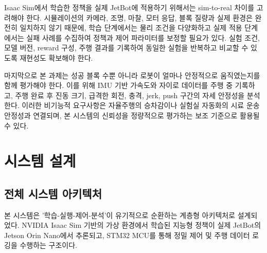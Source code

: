 \documentclass[titlepage]{pnureport}
\begin{document}
Isaac Sim에서 학습한 정책을 실제 JetBot에 적용하기 위해서는 sim-to-real 차이를 고려해야 한다. 시뮬레이션의 카메라, 조명, 마찰, 모터 응답, 블록 질량과 실제 환경은 완전히 일치하지 않기 때문에, 학습 단계에서는 물리 조건을 다양화하고 실제 적용 단계에서는 실패 사례를 수집하여 정책과 제어 파라미터를 보정할 필요가 있다. 실험 조건, 모델 버전, reward 구성, 주행 결과를 기록하여 동일한 실험을 반복하고 비교할 수 있도록 재현성도 확보해야 한다.

마지막으로 본 과제는 성공 블록 수뿐 아니라 로봇이 얼마나 안정적으로 움직였는지를 함께 평가해야 한다. 이를 위해 IMU 기반 가속도와 자이로 데이터를 주행 중 기록하고, 주행 완료 후 진동 크기, 급격한 회전, 충격, jerk, push 구간의 자세 안정성을 분석한다. 이러한 비기능적 요구사항은 자율주행의 승차감이나 실험실 자동화의 시료 운송 안정성과 연결되며, 본 시스템의 신뢰성을 정량적으로 평가하는 보조 기준으로 활용될 수 있다.

\chapter{시스템 설계}

\section{전체 시스템 아키텍처}

본 시스템은 '학습-실행-제어-분석'이 유기적으로 순환하는 계층형 아키텍처로 설계되었다. NVIDIA Isaac Sim 기반의 가상 환경에서 학습된 지능형 정책이 실제 JetBot의 Jetson Orin Nano에서 추론되고, STM32 MCU를 통해 정밀 제어 및 주행 데이터 로깅을 수행하는 구조이다.
\end{document}
